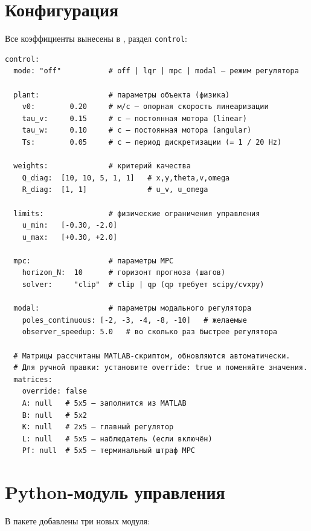 \section{Конфигурация}
\label{sec:config}

Все коэффициенты вынесены в , раздел \texttt{control}:

\begin{filebox}[title={\filepath{config.yaml} --- \texttt{control:}}]
\begin{lstlisting}[basicstyle=\footnotesize\ttfamily]
control:
  mode: "off"           # off | lqr | mpc | modal — режим регулятора

  plant:                # параметры объекта (физика)
    v0:        0.20     # м/с — опорная скорость линеаризации
    tau_v:     0.15     # с — постоянная мотора (linear)
    tau_w:     0.10     # с — постоянная мотора (angular)
    Ts:        0.05     # с — период дискретизации (= 1 / 20 Hz)

  weights:              # критерий качества
    Q_diag:  [10, 10, 5, 1, 1]   # x,y,theta,v,omega
    R_diag:  [1, 1]              # u_v, u_omega

  limits:               # физические ограничения управления
    u_min:   [-0.30, -2.0]
    u_max:   [+0.30, +2.0]

  mpc:                  # параметры MPC
    horizon_N:  10      # горизонт прогноза (шагов)
    solver:     "clip"  # clip | qp (qp требует scipy/cvxpy)

  modal:                # параметры модального регулятора
    poles_continuous: [-2, -3, -4, -8, -10]   # желаемые
    observer_speedup: 5.0   # во сколько раз быстрее регулятора

  # Матрицы рассчитаны MATLAB-скриптом, обновляются автоматически.
  # Для ручной правки: установите override: true и поменяйте значения.
  matrices:
    override: false
    A: null   # 5x5 — заполнится из MATLAB
    B: null   # 5x2
    K: null   # 2x5 — главный регулятор
    L: null   # 5x5 — наблюдатель (если включён)
    Pf: null  # 5x5 — терминальный штраф MPC
\end{lstlisting}
\end{filebox}

\section{Python-модуль управления}
\label{sec:python_impl}

В пакете  добавлены три новых модуля:

